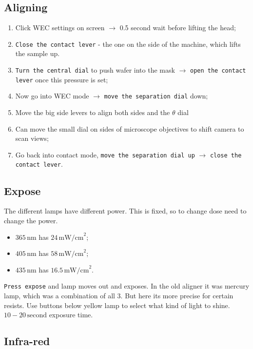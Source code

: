 \subsection{Aligning}
\label{sec:aligning}

\begin{enumerate}
  \item Click WEC settings on screen $\rightarrow$ 0.5 second wait before lifting the
        head;
  \item \texttt{Close the contact lever} - the one on the side of the machine,
        which lifts the sample up.
  \item \texttt{Turn the central dial} to {push wafer into the mask} $\rightarrow$
        \texttt{open the contact lever} once this pressure is set;
  \item Now go into WEC mode $\rightarrow$ \texttt{move the separation dial} down;
  \item Move the big side levers to align both sides and the $\theta$ dial
  \item Can move the small dial on sides of microscope objectives to shift
        camera to scan views;
  \item Go back into contact mode, \texttt{move the separation dial up} $\rightarrow$
        \texttt{close the contact lever}.
\end{enumerate}

\subsection{Expose}
\label{sec:expose}

The different lamps have different power. This is fixed, so to change dose need
to change the power.

\begin{itemize}
  \item $365\,\text{nm}$ has $24\,\text{mW/cm}^{2}$;
  \item $405\,\text{nm}$ has $58\,\text{mW/cm}^{2}$;
  \item $435\,\text{nm}$ has $16.5\,\text{mW/cm}^{2}$.
\end{itemize}

\texttt{Press expose} and lamp moves out and exposes. In the old aligner it was
mercury lamp, which was a combination of all 3. But here its more precise for
certain resists. Use buttons below yellow lamp to select what kind of light to
shine. $10-20\,\text{second}$ exposure time.

\subsection{Infra-red}
\label{sec:infra-red}

